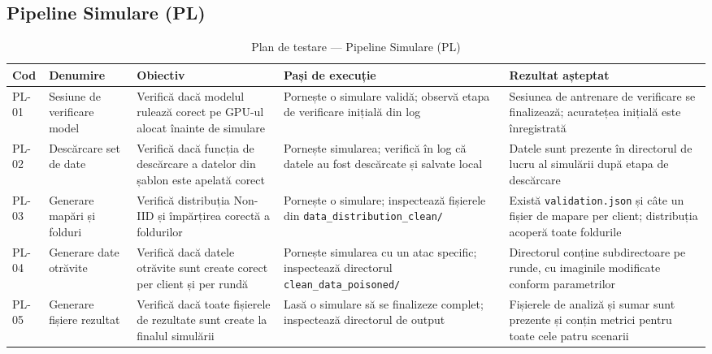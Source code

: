 \documentclass[../../main.tex]{subfiles}
\begin{document}
    \subsection{Pipeline Simulare (PL)}

    \begin{table}[H]
        \centering
        \footnotesize
        \begin{tabular}{|p{}|p{}|p{}|p{}|p{}|}
            \hline
            \textbf{Cod} & \textbf{Denumire} & \textbf{Obiectiv} & \textbf{Pași de execuție} & \textbf{Rezultat așteptat} \\
            \hline
            PL-01 & Sesiune de verificare model & Verifică dacă modelul rulează corect pe GPU-ul alocat înainte de simulare & Pornește o simulare validă; observă etapa de verificare inițială din log & Sesiunea de antrenare de verificare se finalizează; acuratețea inițială este înregistrată \\
            \hline
            PL-02 & Descărcare set de date & Verifică dacă funcția de descărcare a datelor din șablon este apelată corect & Pornește simularea; verifică în log că datele au fost descărcate și salvate local & Datele sunt prezente în directorul de lucru al simulării după etapa de descărcare \\
            \hline
            PL-03 & Generare mapări și folduri & Verifică distribuția Non-IID și împărțirea corectă a foldurilor & Pornește o simulare; inspectează fișierele din \texttt{data\_distribution\_clean/} & Există \texttt{valida\-tion.json} și câte un fișier de mapare per client; distribuția acoperă toate foldurile \\
            \hline
            PL-04 & Generare date otrăvite & Verifică dacă datele otrăvite sunt create corect per client și per rundă & Pornește simularea cu un atac specific; inspectează directorul \texttt{clean\_data\_poisoned/} & Directorul conține subdirectoare pe runde, cu imaginile modificate conform parametrilor \\
            \hline
            PL-05 & Generare fișiere rezultat & Verifică dacă toate fișierele de rezultate sunt create la finalul simulării & Lasă o simulare să se finalizeze complet; inspectează directorul de output & Fișierele de analiză și sumar sunt prezente și conțin metrici pentru toate cele patru scenarii \\
            \hline
        \end{tabular}
        \caption{Plan de testare --- Pipeline Simulare (PL)}
        \label{tab:test_pl}
    \end{table}
\end{document}
